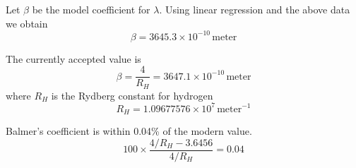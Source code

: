 \documentclass[12pt]{article}
\begin{document}
Let $\beta$ be the model coefficient for $\lambda$.
Using linear regression and the above data we obtain
\begin{equation*}
\beta=3645.3\times10^{-10}\,\text{meter}
\end{equation*}

%
%
%
%
%

The currently accepted value is
\begin{equation*}
\beta=\frac{4}{R_H}=3647.1\times10^{-10}\,\text{meter}
\end{equation*}
where $R_H$ is the Rydberg constant for hydrogen
\begin{equation*}
R_H=1.09677576\times10^7\,\text{meter}^{-1}
\end{equation*}

Balmer's coefficient is within 0.04\% of the modern value.
\begin{equation*}
100\times\frac{4/R_H-3.6456}{4/R_H}=0.04
\end{equation*}
\end{document}
